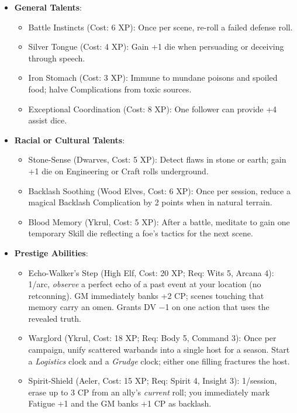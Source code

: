 \begin{itemize}
    \item \textbf{General Talents}:
    \begin{itemize}
        \item Battle Instincts (Cost: 6 XP): Once per scene, re-roll a failed defense roll.
        \item Silver Tongue (Cost: 4 XP): Gain +1 die when persuading or deceiving through speech.
        \item Iron Stomach (Cost: 3 XP): Immune to mundane poisons and spoiled food; halve Complications from toxic sources.
        \item Exceptional Coordination (Cost: 8 XP): One follower can provide +4 assist dice.
    \end{itemize}
    \item \textbf{Racial or Cultural Talents}:
    \begin{itemize}
        \item Stone-Sense (Dwarves, Cost: 5 XP): Detect flaws in stone or earth; gain +1 die on Engineering or Craft rolls underground.
        \item Backlash Soothing (Wood Elves, Cost: 6 XP): Once per session, reduce a magical Backlash Complication by 2 points when in natural terrain.
        \item Blood Memory (Ykrul, Cost: 5 XP): After a battle, meditate to gain one temporary Skill die reflecting a foe's tactics for the next scene.
    \end{itemize}
    \item \textbf{Prestige Abilities}:
    \begin{itemize}
        \item Echo-Walker's Step (High Elf, Cost: 20 XP; Req: Wits 5, Arcana 4): 
1/arc, \emph{observe} a perfect echo of a past event at your location (no retconning). 
GM immediately banks +2 CP; scenes touching that memory carry an omen. Grants DV −1 on one action that uses the revealed truth.
        \item Warglord (Ykrul, Cost: 18 XP; Req: Body 5, Command 3): 
Once per campaign, unify scattered warbands into a single host for a season. Start a \emph{Logistics} clock and a \emph{Grudge} clock; either one filling fractures the host.
        \item Spirit-Shield (Aeler, Cost: 15 XP; Req: Spirit 4, Insight 3): 
1/session, erase up to 3 CP from an ally's \emph{current} roll; you immediately mark Fatigue +1 and the GM banks +1 CP as backlash.
    \end{itemize}
\end{itemize}

